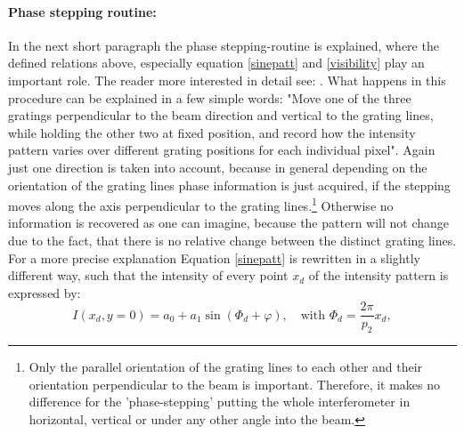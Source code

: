 \paragraph{Phase stepping routine:} In the next short paragraph the phase stepping-routine is explained, where the defined relations above, especially equation \ref{sinepatt} and \ref{visibility} play an important role. The reader more interested in detail see: \citep{Creath1988,Momose2005,Lewis2002,Bech2009,Pfeiffer2008}. What happens in this procedure can be explained in a few simple words: "Move one of the three gratings perpendicular to the beam direction and vertical to the grating lines, while holding the other two at fixed position, and record how the intensity pattern varies over different grating positions for each individual pixel". Again just one direction is taken into account, because in general depending on the orientation of the grating lines phase information is just acquired, if the stepping moves along the axis perpendicular to the grating lines.\footnote{Only the parallel orientation of the grating lines to each other and their orientation perpendicular to the beam is important. Therefore, it makes no difference for the 'phase-stepping' putting the whole interferometer in horizontal, vertical or under any other angle into the beam.} 
Otherwise no information is recovered as one can imagine, because the pattern will not change due to the fact, that there is no relative change between the distinct grating lines. For a more precise explanation Equation \ref{sinepatt} is rewritten in a slightly different way, such that the intensity of every point $x_{d}$ of the intensity pattern is expressed by: 
\begin{equation}
I(x_{d},y = 0) = a_{0} + a_{1}  \sin(\Phi_{d}+ \varphi), \quad \text{with }  \Phi_{d}  = \frac{2\pi}{p_{2}}x_{d},
\end{equation} 
